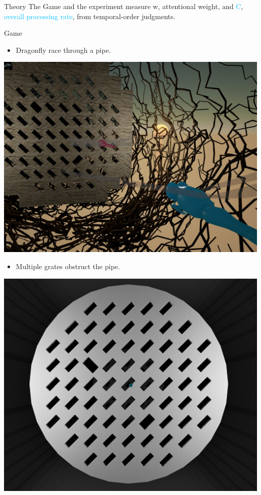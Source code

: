 \documentclass[a0paper,portrait]{baposter}
\begin{document}
\begin{poster}
\begin{posterbox}[name=theory,column=0,row=1,below=intro]{Theory}
The Game and the experiment measure \textcolor{orangec}{w}, \textcolor{orangec}{attentional weight}, and \textcolor{deepskyblue}{C}, \textcolor{deepskyblue}{overall processing rate}, from temporal-order judgments.
\end{posterbox}

\begin{posterbox}[name=game,span=1,column=1,row=1,below=intro]{Game}
\begin{itemize}
\item Dragonfly race through a pipe.
\end{itemize}
\includegraphics[width=1\textwidth]{game.jpg}
\begin{itemize}
\item Multiple grates obstruct the pipe.
\end{itemize}
\includegraphics[width=1 \textwidth]{grate.jpg}

\end{posterbox}
\end{poster}
\end{document}

